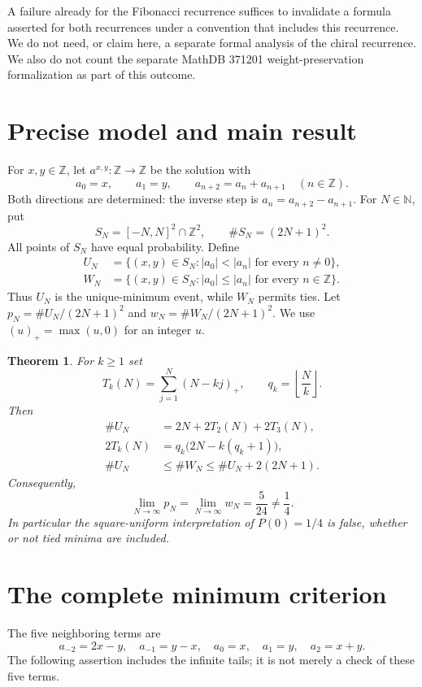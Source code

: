 \documentclass[11pt]{article}
\newtheorem{theorem}{Theorem}
\newcommand{\Z}{\mathbb Z}
\newcommand{\N}{\mathbb N}
\newcommand{\abs}[1]{\lvert#1\rvert}
\newcommand{\pos}[1]{(#1)_{+}}
\begin{document}
A failure already for the Fibonacci recurrence suffices to invalidate a formula asserted for both recurrences under a convention that includes this recurrence. We do not need, or claim here, a separate formal analysis of the chiral recurrence. We also do not count the separate MathDB 371201 weight-preservation formalization as part of this outcome.

\section{Precise model and main result}
For $x,y\in\Z$, let $a^{x,y}\colon\Z\to\Z$ be the solution with
\[
 a_0=x,\qquad a_1=y,\qquad a_{n+2}=a_n+a_{n+1}\quad(n\in\Z).
\]
Both directions are determined: the inverse step is $a_n=a_{n+2}-a_{n+1}$. For $N\in\N$, put
\[
 S_N=[-N,N]^2\cap\Z^2,\qquad \#S_N=(2N+1)^2.
\]
All points of $S_N$ have equal probability. Define
\begin{align*}
 U_N&=\{(x,y)\in S_N:\abs{a_0}<\abs{a_n}\text{ for every }n\ne0\},\\
 W_N&=\{(x,y)\in S_N:\abs{a_0}\le\abs{a_n}\text{ for every }n\in\Z\}.
\end{align*}
Thus $U_N$ is the unique-minimum event, while $W_N$ permits ties. Let $p_N=\#U_N/(2N+1)^2$ and $w_N=\#W_N/(2N+1)^2$. We use $\pos{u}=\max(u,0)$ for an integer $u$.

\begin{theorem}\label{thm:main}
For $k\ge1$ set
\[
 T_k(N)=\sum_{j=1}^{N}\pos{N-kj},\qquad q_k=\left\lfloor\frac{N}{k}\right\rfloor.
\]
Then
\begin{align}
 \#U_N&=2N+2T_2(N)+2T_3(N),\label{eq:count}\\
 2T_k(N)&=q_k\bigl(2N-k(q_k+1)\bigr),\label{eq:triangle}\\
 \#U_N&\le\#W_N\le\#U_N+2(2N+1).\label{eq:tie}
\end{align}
Consequently,
\[
 \lim_{N\to\infty}p_N=\lim_{N\to\infty}w_N=\frac5{24}\ne\frac14.
\]
In particular the square-uniform interpretation of $P(0)=1/4$ is false, whether or not tied minima are included.
\end{theorem}

\section{The complete minimum criterion}
The five neighboring terms are
\[
 a_{-2}=2x-y,\quad a_{-1}=y-x,\quad a_0=x,\quad a_1=y,\quad a_2=x+y.
\]
The following assertion includes the infinite tails; it is not merely a check of these five terms.
\end{document}
